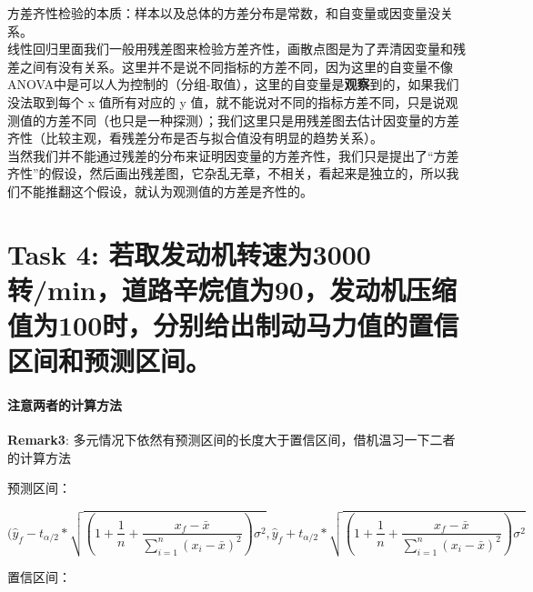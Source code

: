 \documentclass[11pt]{article}
\begin{document}
方差齐性检验的本质：样本以及总体的方差分布是常数，和自变量或因变量没关系。\\
线性回归里面我们一般用残差图来检验方差齐性，画散点图是为了弄清因变量和残差之间有没有关系。这里并不是说不同指标的方差不同，因为这里的自变量不像ANOVA中是可以人为控制的（分组-取值），这里的自变量是\textbf{观察}到的，如果我们没法取到每个
x 值所有对应的 y
值，就不能说对不同的指标方差不同，只是说观测值的方差不同（也只是一种探测）；我们这里只是用残差图去估计因变量的方差齐性（比较主观，看残差分布是否与拟合值没有明显的趋势关系）。\\
当然我们并不能通过残差的分布来证明因变量的方差齐性，我们只是提出了``方差齐性''的假设，然后画出残差图，它杂乱无章，不相关，看起来是独立的，所以我们不能推翻这个假设，就认为观测值的方差是齐性的。

    \hypertarget{task-4-ux82e5ux53d6ux53d1ux52a8ux673aux8f6cux901fux4e3a3000ux8f6cminux9053ux8defux8f9bux70f7ux503cux4e3a90ux53d1ux52a8ux673aux538bux7f29ux503cux4e3a100ux65f6ux5206ux522bux7ed9ux51faux5236ux52a8ux9a6cux529bux503cux7684ux7f6eux4fe1ux533aux95f4ux548cux9884ux6d4bux533aux95f4}{%
\section{Task 4:
若取发动机转速为3000转/min，道路辛烷值为90，发动机压缩值为100时，分别给出制动马力值的置信区间和预测区间。}\label{task-4-ux82e5ux53d6ux53d1ux52a8ux673aux8f6cux901fux4e3a3000ux8f6cminux9053ux8defux8f9bux70f7ux503cux4e3a90ux53d1ux52a8ux673aux538bux7f29ux503cux4e3a100ux65f6ux5206ux522bux7ed9ux51faux5236ux52a8ux9a6cux529bux503cux7684ux7f6eux4fe1ux533aux95f4ux548cux9884ux6d4bux533aux95f4}}

    \hypertarget{ux6ce8ux610fux4e24ux8005ux7684ux8ba1ux7b97ux65b9ux6cd5}{%
\paragraph{注意两者的计算方法}\label{ux6ce8ux610fux4e24ux8005ux7684ux8ba1ux7b97ux65b9ux6cd5}}

    \textbf{Remark3}:
多元情况下依然有预测区间的长度大于置信区间，借机温习一下二者的计算方法

预测区间：

\[
(\hat{y}_{f}-t_{\alpha/2}*\sqrt{(1+\frac{1}{n}+\frac{x_{f}-\bar{x}}{\sum_{i=1}^{n}\left(x_{i}-\bar{x}\right)^{2}})\sigma^{2}},\hat{y}_{f}+t_{\alpha/2}*\sqrt{(1+\frac{1}{n}+\frac{x_{f}-\bar{x}}{\sum_{i=1}^{n}\left(x_{i}-\bar{x}\right)^{2}})\sigma^{2}}\]

置信区间：
\end{document}
